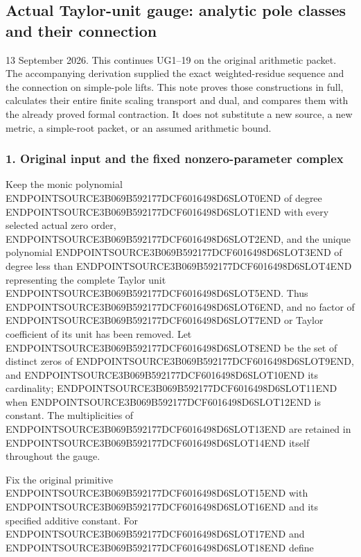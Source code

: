\subsection{Actual Taylor-unit gauge: analytic pole classes and their connection}\label{endpoint-analytic_pole--actual-taylor-unit-gauge-analytic-pole-classes-and-their-connection}

13 September 2026. This continues UG1--19 on the original arithmetic packet. The accompanying derivation supplied the exact weighted-residue sequence and the connection on simple-pole lifts. This note proves those constructions in full, calculates their entire finite scaling transport and dual, and compares them with the already proved formal contraction. It does not substitute a new source, a new metric, a simple-root packet, or an assumed arithmetic bound.

\subsubsection{1. Original input and the fixed nonzero-parameter complex}\label{endpoint-analytic_pole--original-input-and-the-fixed-nonzero-parameter-complex}

Keep the monic polynomial ENDPOINTSOURCE3B069B592177DCF6016498D6SLOT0END of degree ENDPOINTSOURCE3B069B592177DCF6016498D6SLOT1END with every selected actual zero order, ENDPOINTSOURCE3B069B592177DCF6016498D6SLOT2END, and the unique polynomial ENDPOINTSOURCE3B069B592177DCF6016498D6SLOT3END of degree less than ENDPOINTSOURCE3B069B592177DCF6016498D6SLOT4END representing the complete Taylor unit ENDPOINTSOURCE3B069B592177DCF6016498D6SLOT5END. Thus ENDPOINTSOURCE3B069B592177DCF6016498D6SLOT6END, and no factor of ENDPOINTSOURCE3B069B592177DCF6016498D6SLOT7END or Taylor coefficient of its unit has been removed. Let ENDPOINTSOURCE3B069B592177DCF6016498D6SLOT8END be the set of distinct zeros of ENDPOINTSOURCE3B069B592177DCF6016498D6SLOT9END, and ENDPOINTSOURCE3B069B592177DCF6016498D6SLOT10END its cardinality; ENDPOINTSOURCE3B069B592177DCF6016498D6SLOT11END when ENDPOINTSOURCE3B069B592177DCF6016498D6SLOT12END is constant. The multiplicities of ENDPOINTSOURCE3B069B592177DCF6016498D6SLOT13END are retained in ENDPOINTSOURCE3B069B592177DCF6016498D6SLOT14END itself throughout the gauge.

Fix the original primitive ENDPOINTSOURCE3B069B592177DCF6016498D6SLOT15END with ENDPOINTSOURCE3B069B592177DCF6016498D6SLOT16END and its specified additive constant. For ENDPOINTSOURCE3B069B592177DCF6016498D6SLOT17END and ENDPOINTSOURCE3B069B592177DCF6016498D6SLOT18END define

